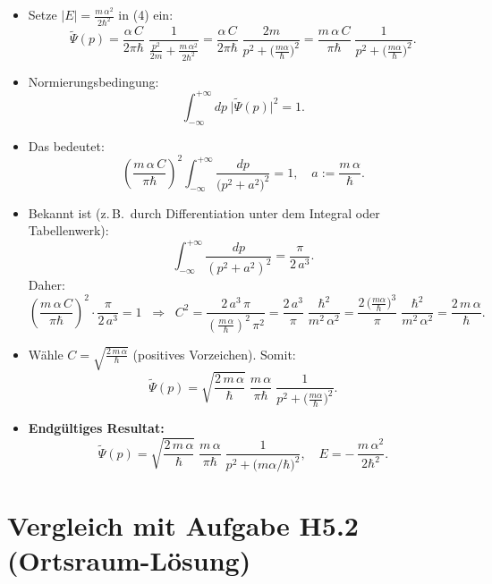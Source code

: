 \documentclass[12pt,a4paper]{scrartcl}
\begin{document}
\begin{itemize}
  \item Setze $|E| = \tfrac{m\,\alpha^2}{2\hbar^2}$ in (4) ein:
  \[
    \widetilde\Psi(p)
    = \frac{\alpha\,C}{2\pi\hbar}\;\frac{1}{\frac{p^2}{2m} + \frac{m\,\alpha^2}{2\hbar^2}}
    = \frac{\alpha\,C}{2\pi\hbar}\;\frac{2m}{p^2 + \bigl(\tfrac{m\alpha}{\hbar}\bigr)^2}
    = \frac{m\,\alpha\,C}{\pi\hbar}\;\frac{1}{p^2 + \bigl(\tfrac{m\alpha}{\hbar}\bigr)^2}.
  \]
  \item Normierungsbedingung:
  \[
    \int_{-\infty}^{+\infty} dp\;\bigl|\widetilde\Psi(p)\bigr|^2 = 1.
  \]
  \item Das bedeutet:
  \[
    \left(\frac{m\,\alpha\,C}{\pi\hbar}\right)^2
    \int_{-\infty}^{+\infty} \frac{dp}{\bigl(p^2 + a^2\bigr)^2} = 1,
    \quad a := \frac{m\,\alpha}{\hbar}.
  \]
  \item Bekannt ist (z.\,B.\ durch Differentiation unter dem Integral oder Tabellenwerk):
  \[
    \int_{-\infty}^{+\infty} \frac{dp}{(p^2 + a^2)^2} = \frac{\pi}{2\,a^3}.
  \]
  Daher:
  \[
    \left(\frac{m\,\alpha\,C}{\pi\hbar}\right)^2 \cdot \frac{\pi}{2\,a^3} = 1
    \;\;\Longrightarrow\;\;
    C^2 = \frac{2\,a^3\,\pi}{\left(\frac{m\,\alpha}{\hbar}\right)^2\,\pi^2} 
    = \frac{2\,a^3}{\pi}\;\frac{\hbar^2}{m^2\,\alpha^2}
    = \frac{2\,\bigl(\tfrac{m\alpha}{\hbar}\bigr)^3}{\pi}\;\frac{\hbar^2}{m^2\,\alpha^2}
    = \frac{2\,m\,\alpha}{\hbar}.
  \]
  \item Wähle $C = \sqrt{\frac{2\,m\,\alpha}{\hbar}}$ (positives Vorzeichen). Somit:
  \[
    \widetilde\Psi(p)
    = \sqrt{\frac{2\,m\,\alpha}{\hbar}}\;\frac{m\,\alpha}{\pi\hbar}\;\frac{1}{p^2 + \bigl(\tfrac{m\alpha}{\hbar}\bigr)^2}.
  \]
  \item \textbf{Endgültiges Resultat:}
  \[
    \boxed{
      \widetilde\Psi(p) 
      = \sqrt{\frac{2\,m\,\alpha}{\hbar}}\;\frac{m\,\alpha}{\pi\hbar}\;\frac{1}{p^2 + \bigl(m\alpha/\hbar\bigr)^2},
      \quad
      E = -\,\frac{m\,\alpha^2}{2\hbar^2}.
    }
  \]
\end{itemize}

\newpage
\section{Vergleich mit Aufgabe H5.2 (Ortsraum-Lösung)}
\end{document}
